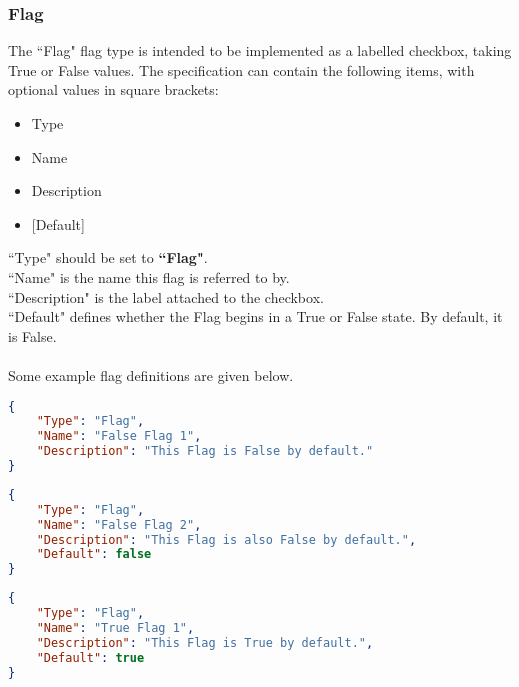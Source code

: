\documentclass{article}
\begin{document}
\subsubsection{Flag}
The ``Flag" flag type is intended to be implemented as a labelled checkbox, taking True or False values. The specification can contain the following items, with optional values in square brackets:
\begin{itemize}
\item Type
\item Name
\item Description
\item {[Default]}
\end{itemize}
``Type" should be set to \textbf{``Flag"}.\\
``Name" is the name this flag is referred to by.\\
``Description" is the label attached to the checkbox.\\
``Default" defines whether the Flag begins in a True or False state. By default, it is False.\\\\
Some example flag definitions are given below.
\begin{lstlisting}[language=json,firstnumber=1]
{
    "Type": "Flag",
    "Name": "False Flag 1",
    "Description": "This Flag is False by default."
}
\end{lstlisting}
\begin{lstlisting}[language=json,firstnumber=1]
{
    "Type": "Flag",
    "Name": "False Flag 2",
    "Description": "This Flag is also False by default.",
    "Default": false
}
\end{lstlisting}
\newpage
\begin{lstlisting}[language=json,firstnumber=1]
{
    "Type": "Flag",
    "Name": "True Flag 1",
    "Description": "This Flag is True by default.",
    "Default": true
}
\end{lstlisting}
\end{document}

